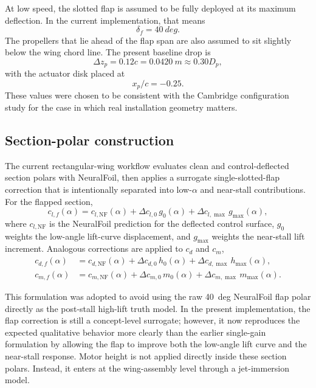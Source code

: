 \documentclass[conf]{new-aiaa}
\begin{document}
At low speed, the slotted flap is assumed to be fully deployed at its maximum deflection. In the current implementation, that means
\begin{equation}
\delta_f = \SI{40}{deg}.
\end{equation}
The propellers that lie ahead of the flap span are also assumed to sit slightly below the wing chord line. The present baseline drop is
\begin{equation}
\Delta z_p = 0.12 c = \SI{0.0420}{m} \approx 0.30 D_p,
\end{equation}
with the actuator disk placed at
\begin{equation}
x_p/c = -0.25.
\end{equation}
These values were chosen to be consistent with the Cambridge configuration study for the case in which real installation geometry matters.\cite{Hawkswell2022}

\subsection{Section-polar construction}

The current rectangular-wing workflow evaluates clean and control-deflected section polars with NeuralFoil, then applies a surrogate single-slotted-flap correction that is intentionally separated into low-\(\alpha\) and near-stall contributions. For the flapped section,
\begin{equation}
c_{l,f}(\alpha)
=
c_{l,\mathrm{NF}}(\alpha)
+
\Delta c_{l,0}\, g_0(\alpha)
+
\Delta c_{l,\max}\, g_{\max}(\alpha),
\end{equation}
where \(c_{l,\mathrm{NF}}\) is the NeuralFoil prediction for the deflected control surface, \(g_0\) weights the low-angle lift-curve displacement, and \(g_{\max}\) weights the near-stall lift increment. Analogous corrections are applied to \(c_d\) and \(c_m\),
\begin{align}
c_{d,f}(\alpha)
&=
c_{d,\mathrm{NF}}(\alpha)
+
\Delta c_{d,0}\, h_0(\alpha)
+
\Delta c_{d,\max}\, h_{\max}(\alpha), \\
c_{m,f}(\alpha)
&=
c_{m,\mathrm{NF}}(\alpha)
+
\Delta c_{m,0}\, m_0(\alpha)
+
\Delta c_{m,\max}\, m_{\max}(\alpha).
\end{align}

This formulation was adopted to avoid using the raw \SI{40}{deg} NeuralFoil flap polar directly as the post-stall high-lift truth model. In the present implementation, the flap correction is still a concept-level surrogate; however, it now reproduces the expected qualitative behavior more clearly than the earlier single-gain formulation by allowing the flap to improve both the low-angle lift curve and the near-stall response. Motor height is not applied directly inside these section polars. Instead, it enters at the wing-assembly level through a jet-immersion model.
\end{document}
